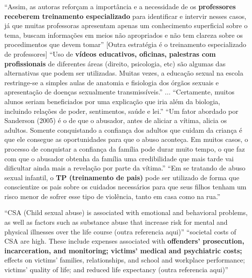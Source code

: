 ``Assim, as autoras reforçam a importância e a necessidade de os \textbf{professores receberem treinamento especializado} para identificar e intervir nesses casos, já que muitas professoras apresentam apenas um conhecimento superficial sobre o tema, buscam informações em meios não apropriados e não tem clareza sobre os procedimentos que devem tomar'' [Outra estratégia é o treinamento especializado de professores] ``Uso de \textbf{vídeos educativos, oficinas, palestras com profissionais} de diferentes áreas (direito, psicologia, etc) são algumas das alternativas que podem ser utilizadas. Muitas vezes, a educação sexual na escola restringe-se a simples aulas de anatomia e fisiologia dos órgãos sexuais e apresentação de doenças sexualmente transmissíveis.'' ... ``Certamente, muitos alunos seriam beneficiados por uma explicação que iria além da biologia, incluindo relações de poder, sentimentos, saúde e lei.'' ``Um fator abordado por Sanderson (2005) é o de que o abusador, antes de aliciar a vítima, alicia os adultos. Somente conquistando a confiança dos adultos que cuidam da criança é que ele consegue as oportunidades para que o abuso aconteça. Em muitos casos, o processo de conquistar a confiança da família pode durar muito tempo, o que faz com que o abusador obtenha da família uma credibilidade que mais tarde vai dificultar ainda mais a revelação por parte da vítima.'' ``Em se tratando de abuso sexual infantil, o \textbf{TP (treinamento de pais)} pode ser utilizado de forma que conscientize os pais sobre os cuidados necessários para que seus filhos tenham um risco menor de sofrer esse tipo de violência, tanto em casa como na rua.'' \cite{pelisoli2010prevenccao}


``CSA (Child sexual abuse) is associated with emotional and behavioral problems, as well as factors such as substance abuse that increase risk for mental and physical illnesses over the life course (outra referencia aqui)'' ``societal costs of CSA are high. These include expenses associated with \textbf{offenders’ prosecution, incarceration, and monitoring; victims’ medical and psychiatric costs;} effects on victims’ families, relationships, and school and workplace performance; victims’ quality of life; and reduced life expectancy (outra referencia aqui)'' \cite{mendelson2015parent}

